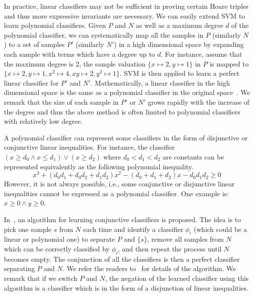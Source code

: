 In practice, linear classifiers may not be sufficient in proving certain Hoare triples and thus more expressive invariants are necessary. We can easily extend SVM to learn polynomial classifiers. Given $P$ and $N$ as well as a maximum degree $d$ of the polynomial classifier, we can systematically map all the samples in $P$ (similarly $N$) to a set of samples $P'$ (similarly $N'$) in a high dimensional space by expanding each sample with terms which have a degree up to $d$. For instance, assume that the maximum degree is 2, the sample valuation $\{ x \mapsto 2, y \mapsto 1\}$ in $P$ is mapped to $\{x \mapsto 2, y \mapsto 1, x^2 \mapsto 4, xy \mapsto 2, y^2 \mapsto 1\}$.
SVM is then applied to learn a perfect linear classifier for $P'$ and $N'$. Mathematically, a linear classifier in the high dimensional space is the same as a polynomial classifier in the original space~\cite{svm:kernel}.
We remark that the size of each sample in $P'$ or $N'$ grows rapidly with the increase of the degree and thus the above method is often limited to polynomial classifiers with relatively low degree.

A polynomial classifier can represent some classifiers in the form of disjunctive or conjunctive linear inequalities. For instance, the classifier $(x \ge d_0 \wedge x \le d_1) \vee (x \ge d_2)$
where $d_0 < d_1 < d_2$ are constants can be represented equivalently as the following polynomial inequality.
\[
x^3 + (d_0d_1 + d_0d_2 + d_1d_2)x^2 - (d_0 + d_1 + d_2)x - d_0d_1d_2 \geq 0
\]
However, it is not always possible, i.e., some conjunctive or disjunctive linear inequalities cannot be expressed as a polynomial classifier. One example is: $x \ge 0 \land y \ge 0$.

In~\cite{sharma2012interpolants}, an algorithm for learning conjunctive classifiers is proposed. The idea is to pick one sample $s$ from $N$ each time and identify a classifier $\phi_i$ (which could be a linear or polynomial one) to separate $P$ and $\{s\}$, remove all samples from $N$ which can be correctly classified by $\phi_i$, and then repeat the process until $N$ becomes empty. The conjunction of all the classifiers is then a perfect classifier separating $P$ and $N$. We refer the readers to~\cite{sharma2012interpolants} for details of the algorithm. We remark that if we switch $P$ and $N$, the negation of the learned classifier using this algorithm is a classifier which is in the form of a disjunction of linear inequalities.

